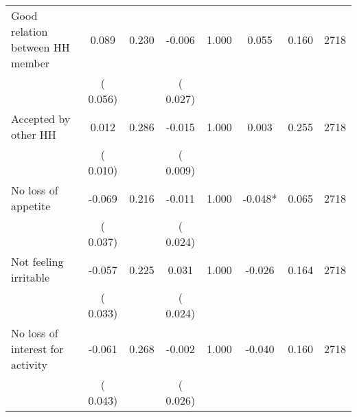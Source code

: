 \begin{tabular}{l*{7}{c}}
 Good relation between HH member       &              0.089       &        0.230  &             -0.006       &        1.000  &              0.055       &              0.160 &  2718 \\ 
                       &       (       0.056)             &                               &       (       0.027)                     &                               &                                               &                                &                      \\ 

 Accepted by other HH       &              0.012       &        0.286  &             -0.015       &        1.000  &              0.003       &              0.255 &  2718 \\ 
                       &       (       0.010)             &                               &       (       0.009)                     &                               &                                               &                                &                      \\ 

 No loss of appetite       &             -0.069       &        0.216  &             -0.011       &        1.000  &             -0.048*       &              0.065 &  2718 \\ 
                       &       (       0.037)             &                               &       (       0.024)                     &                               &                                               &                                &                      \\ 

 Not feeling irritable       &             -0.057       &        0.225  &              0.031       &        1.000  &             -0.026       &              0.164 &  2718 \\ 
                       &       (       0.033)             &                               &       (       0.024)                     &                               &                                               &                                &                      \\ 

 No loss of interest for activity       &             -0.061       &        0.268  &             -0.002       &        1.000  &             -0.040       &              0.160 &  2718 \\ 
                       &       (       0.043)             &                               &       (       0.026)                     &                               &                                               &                                &                      \\ 


\end{tabular}
